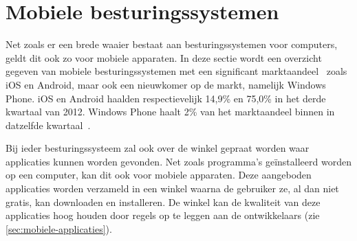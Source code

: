 
\section{Mobiele besturingssystemen}
\label{sec:mobiele-besturingssystemen}
Net zoals er een brede waaier bestaat aan besturingssystemen voor computers, geldt dit ook zo voor mobiele apparaten. 
In deze sectie wordt een overzicht gegeven van mobiele besturingssystemen met een significant marktaandeel~\cite{David2011, Hales2012} zoals iOS en Android, maar ook een nieuwkomer op de markt, namelijk Windows Phone.
iOS en Android haalden respectievelijk 14,9\% en 75,0\% in het derde kwartaal van 2012.
Windows Phone haalt 2\% van het marktaandeel binnen in datzelfde kwartaal~\cite{Protalinski2012}.

Bij ieder besturingssysteem zal ook over de winkel gepraat worden waar applicaties kunnen worden gevonden.
Net zoals programma's geïnstalleerd worden op een computer, kan dit ook voor mobiele apparaten.
Deze aangeboden applicaties worden verzameld in een winkel waarna de gebruiker ze, al dan niet gratis, kan downloaden en installeren.
De winkel kan de kwaliteit van deze applicaties hoog houden door regels op te leggen aan de ontwikkelaars (zie \ref{sec:mobiele-applicaties}).

\begin{table}[t]
\centering
{}
\quad
{}
\caption{Marktaandeel van iOS-versies op 8~mei~2013 en Android-versies op 1~mei~2013.  \protect\cite{Smith2013,Android2013}.}
\label{tabel:marktaandeel-ios-android}
\end{table}

